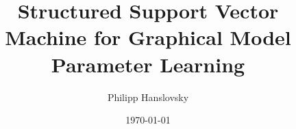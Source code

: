 



\title{Structured Support Vector Machine for Graphical Model Parameter Learning}

\author{Philipp Hanslovsky}
\date{\today}



\maketitle





\appendix %
\setcounter{finalframe}{\value{framenumber}}

% 

\setcounter{framenumber}{\value{finalframe}}





